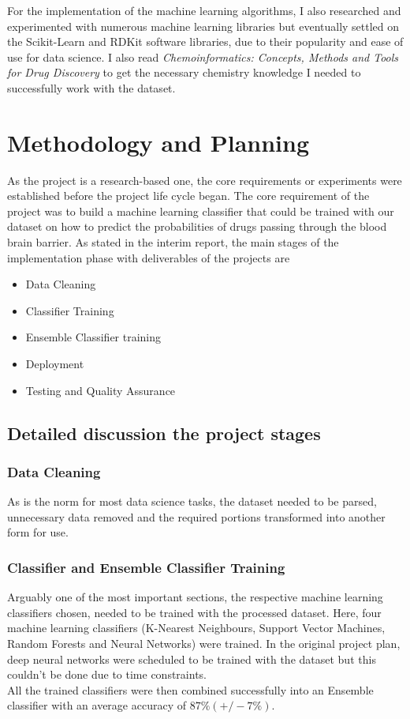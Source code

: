 \documentclass[a4paper,12pt]{article}
\begin{document}
	For the implementation of the machine learning algorithms, I also researched and experimented with numerous machine learning libraries but eventually settled on the Scikit-Learn and RDKit software libraries, due to their popularity and ease of use for data science. I also read \textit{Chemoinformatics: Concepts, Methods and Tools for Drug Discovery} to get the necessary chemistry knowledge I needed to successfully work with the dataset.
	
\section{Methodology and Planning}
	As the project is a research-based one, the core requirements or experiments were established before the project life cycle began. The core requirement of the project was to build a machine learning classifier that could be trained with our dataset on how to predict the probabilities of drugs passing through the blood brain barrier. As stated in the interim report, the main stages of the implementation phase with deliverables of the projects are
		\begin{itemize}
			\item Data Cleaning
			\item Classifier Training
			\item Ensemble Classifier training
			\item Deployment 
			\item Testing and Quality Assurance
		\end{itemize}
	\subsection{Detailed discussion the project stages}
		\subsubsection{Data Cleaning}
		As is the norm for most data science tasks, the dataset needed to be parsed, unnecessary data removed and the required portions transformed into another form for use. 
		\subsubsection{Classifier and Ensemble Classifier Training}
		Arguably one of the most important sections, the respective machine learning classifiers chosen, needed to be trained with the processed dataset. Here, four machine learning classifiers (K-Nearest Neighbours, Support Vector Machines, Random Forests and Neural Networks) were trained. In the original project plan, deep neural networks were scheduled to be trained with the dataset but this couldn't be done due to time constraints.\\
		All the trained classifiers were then combined successfully into an Ensemble classifier with an average accuracy of $87\% (+/- 7\%)$.
\end{document}
